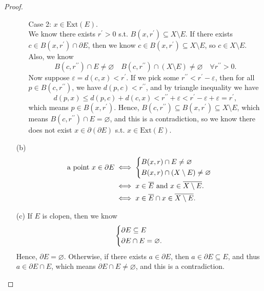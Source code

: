 \begin{proof}
\begin{itemize}
\begin{itemize}
      \item [Case 2:] \(x \in \mathrm{Ext}(E) \). \\ 
      We know there exists \(r^{\prime} > 0\) s.t. \(B(x, r^{\prime}) \subseteq X\setminus E\). If there exists \(c \in B(x, r^{\prime} ) \cap \partial E\), then we know \(c \in B(x, r^{\prime} ) \subseteq X\setminus E\), so \(c \in X\setminus E\). Also, we know 
      \[
        B(c, r^{\prime\prime} ) \cap E \neq \varnothing \quad B(c, r^{\prime\prime} ) \cap (X \setminus E) \neq \varnothing \quad \forall r^{\prime\prime} >0.
      \]
      Now suppose \(\varepsilon = d(c, x) < r^{\prime} \). If we pick some \(r^{\prime\prime} < r^{\prime}  - \varepsilon \), then for all \(p \in B(c, r^{\prime\prime} )\), we have \(d(p, c) < r^{\prime\prime} \), and by triangle inequality we have 
      \[
        d(p,x) \le d(p,c) + d(c,x) < r^{\prime\prime} + \varepsilon < r^{\prime} - \varepsilon + \varepsilon = r^{\prime} ,
      \] which means \(p \in B(x, r^{\prime} )\). Hence, \(B(c, r^{\prime\prime} ) \subseteq B(x, r^{\prime} ) \subseteq X\setminus E\), which means \(B(c, r^{\prime\prime} ) \cap E = \varnothing \), and this is a contradiction, so we know there does not exist \(x \in \partial (\partial E) \) s.t. \(x \in \mathrm{Ext}(E) \).   
    \end{itemize}
    \item [(b)]
    \begin{align*}
      \text{a point } x \in \partial E &\iff \begin{dcases}
        B(x, r) \cap E \neq \varnothing \\
        B(x,r) \cap (X\setminus E) \neq \varnothing 
      \end{dcases} \\
      & \iff x \in \overline{E} \text{ and } x \in \overline{X \setminus E}.  \\
      &\iff x \in \overline{E} \cap x \in \overline{X \setminus E}.  
    \end{align*}
    \item [(c)] If \(E\) is clopen, then we know 
    \[
      \begin{dcases}
        \partial E \subseteq E \\
        \partial E \cap E = \varnothing.
      \end{dcases}
    \]
    Hence, \(\partial E = \varnothing \). Otherwise, if there exists \(a \in \partial E\), then \(a \in \partial E \subseteq E\), and thus \(a \in \partial E \cap E\), which means \(\partial E \cap E \neq \varnothing \), and this is a contradiction.     

\end{itemize}
\end{proof}
